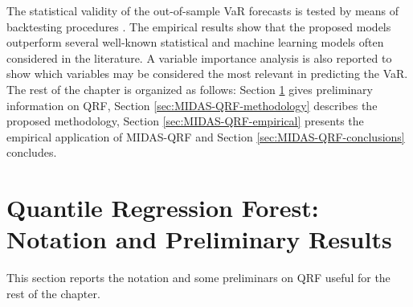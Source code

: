 \vspace{0.15in}

\noindent The statistical validity of the out-of-sample VaR forecasts is tested by means of backtesting procedures \citep{christoffersen1998evaluating, christoffersen2004backtesting, engle2004caviar}. The empirical results show that the proposed models outperform several well-known statistical and machine learning models often considered in the literature. A variable importance analysis is also reported to show which variables may be considered the most relevant in predicting the VaR.
The rest of the chapter is organized as follows: Section \ref{sec:MIDAS-QRF-notation} gives preliminary information on QRF, Section \ref{sec:MIDAS-QRF-methodology} describes the proposed methodology, Section \ref{sec:MIDAS-QRF-empirical} presents the empirical application of MIDAS-QRF and Section \ref{sec:MIDAS-QRF-conclusions} concludes.


\section{Quantile Regression Forest: Notation and Preliminary Results}
\label{sec:MIDAS-QRF-notation}

This section reports the notation and some preliminars on QRF useful for the rest of the chapter. 
\vspace{0.15in}






